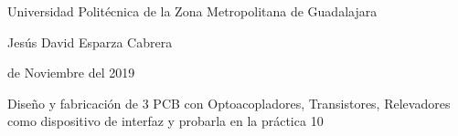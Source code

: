 \documentclass[12pt]{article}
\begin{document}
\vspace{\baselineskip}

\vspace{\baselineskip}
\begin{adjustwidth}{0.0in}{0.01in}
{\fontsize{16pt}{19.2pt}\selectfont Universidad Politécnica de la Zona Metropolitana de Guadalajara\par}\par

\end{adjustwidth}

\begin{adjustwidth}{0.0in}{0.01in}
{\fontsize{16pt}{19.2pt}\selectfont Jesús David Esparza Cabrera\par}\par

\end{adjustwidth}


\vspace{\baselineskip}
\begin{adjustwidth}{0.0in}{0.01in}
{\fontsize{16pt}{19.2pt} de Noviembre del 2019\par}\par

\end{adjustwidth}


\vspace{\baselineskip}
\begin{adjustwidth}{0.0in}{0.01in}
{\fontsize{16pt}{19.2pt}\selectfont \textcolor[HTML]{21409A}{Diseño y fabricación de 3 PCB con Optoacopladores, Transistores, Relevadores como dispositivo de interfaz y probarla en la práctica 10}\par}\par

\end{adjustwidth}



\end{document}
